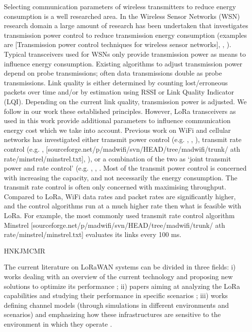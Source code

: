 Selecting communication parameters of wireless transmitters to reduce energy consumption is a well researched area.
In the Wireless Sensor Networks (WSN) research domain a large amount of research has been undertaken that investigates transmission power control to reduce transmission energy consumption (examples are [Transmission power control techniques for wireless sensor networks],
	\cite{lin_atpc_2006},
	\cite{zurita_ares_power_2007}).
Typical transceivers used for WSNs only provide transmission power as means to influence energy consumption.
Existing algorithms to adjust transmission power depend on probe transmissions;
	often data transmissions double as probe transmissions.
Link quality is either determined by counting lost/erroneous packets over time and/or by estimation using RSSI or Link Quality Indicator (LQI).
Depending on the current link quality,
	transmission power is adjusted.
We follow in our work these established principles.
However,
	LoRa transceivers as used in this work provide additional parameters to influence communication energy cost which we take into account.
Previous work on WiFi and cellular networks has investigated either transmit power control (e.g.
\cite{monks_power_2001},
	\cite{muqattash_single-channel_2004},
	\cite{lin_atpc_2006}),
	transmit rate control (e.g.
\cite{lacage_ieee_2004},
	[sourceforge.net/p/madwiﬁ/svn/HEAD/tree/madwiﬁ/trunk/ ath rate/minstrel/minstrel.txt],
	\cite{wong_robust_2006}),
	or a combination of the two as ‘joint transmit power and rate control’ (e.g.
\cite{ramachandran_symphony_2010},
	\cite{subramanian_joint_2005},
	\cite{chevillat_dynamic_2005}.
Most of the transmit power control is concerned with increasing the capacity,
	and not necessarily the energy consumption.
The transmit rate control is often only concerned with maximising throughput.
Compared to LoRa,
	WiFi data rates and packet rates are significantly higher,
	and the control algorithms run at a much higher rate then what is feasible with LoRa.
For example,
	the most commonly used transmit rate control algorithm Minstrel [sourceforge.net/p/madwiﬁ/svn/HEAD/tree/madwiﬁ/trunk/ ath rate/minstrel/minstrel.txt] evaluates its links every 100 ms.

\cite{cuomo_explora_2017} HNKJMCMR

The current literature on LoRaWAN systems can be divided in three fields:
	i) works dealing with an overview of the current technology and proposing new solutions to optimize its performance \cite{bor_lora_nodate} \cite{augustin_study_2016};
	ii) papers aiming at analyzing the LoRa capabilities and studying their performance in specific scenarios \cite{voigt_mitigating_2016}\cite{georgiou_low_2017}\cite{mikhaylov_analysis_2016}\cite{reynders_power_2017};
	iii) works defining channel models (through simulations in different environments and scenarios) and emphasizing how these infrastructures are sensitive to the environment in which they operate \cite{petajajarvi_coverage_2015}.

